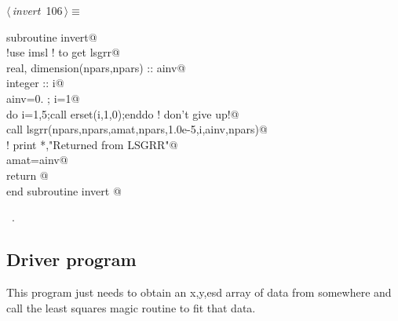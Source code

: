 \documentclass[10pt,a4paper,notitlepage]{article}
\begin{document}
\begin{flushleft} \small
\begin{minipage}{\linewidth}\label{scrap130}\raggedright\small
{} $\langle\,${\it invert}\nobreak\ {\footnotesize {106}}$\,\rangle\equiv$
\vspace{-1ex}
\begin{list}{}{} \item
\mbox{}\verb@      subroutine invert@\\
\mbox{}\verb@      !use imsl ! to get lsgrr@\\
\mbox{}\verb@      real, dimension(npars,npars) :: ainv@\\
\mbox{}\verb@      integer :: i@\\
\mbox{}\verb@      ainv=0. ; i=1@\\
\mbox{}\verb@      do i=1,5;call erset(i,1,0);enddo ! don't give up!@\\
\mbox{}\verb@      call lsgrr(npars,npars,amat,npars,1.0e-5,i,ainv,npars)@\\
\mbox{}\verb@!      print *,"Returned from LSGRR"@\\
\mbox{}\verb@      amat=ainv@\\
\mbox{}\verb@      return @\\
\mbox{}\verb@      end subroutine invert                                                  @{\NWsep}
\end{list}
\vspace{-1.5ex}
\footnotesize
\begin{list}{}{\setlength{\itemsep}{-\parsep}\setlength{\itemindent}{-\leftmargin}}
\item \NWtxtMacroRefIn\ .

\item{}
\end{list}
\end{minipage}\vspace{4ex}
\end{flushleft}
\subsection{Driver program}

This program just needs to obtain an x,y,esd array of data
from somewhere and call the least squares magic routine to fit that
data.
\end{document}
